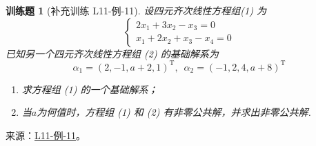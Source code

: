 \documentclass[12pt,fontset=fandol]{ctexart}
\newtheorem{exercise}{训练题}[section]
\begin{document}
\begin{exercise}[补充训练 L11-例-11]\label{prob:L11-例-11}
设四元齐次线性方程组(1) 为\[\begin{cases}
            2x_1+3x_2-x_3=0 \\ x_1+2x_2+x_3-x_4=0
        \end{cases}\]已知另一个四元齐次线性方程组 (2) 的基础解系为
    \[\alpha_1=(2,-1,a+2,1)^\mathrm{T},\enspace\alpha_2=(-1,2,4,a+8)^\mathrm{T}\]
    \begin{enumerate}
        \item 求方程组 (1) 的一个基础解系；

        \item 当$a$为何值时，方程组 (1) 和 (2) 有非零公共解，并求出非零公共解.
    \end{enumerate}
\end{exercise}
\noindent 来源：\href{https://github.com/yhwu-is/Linear-Algebra-Left-Undone/blob/new/%E8%AE%B2%E4%B9%89/%E4%B8%93%E9%A2%98/11%20%E6%9C%9D%E8%8A%B1%E5%A4%95%E6%8B%BE.tex}{L11-例-11}。
\end{document}
